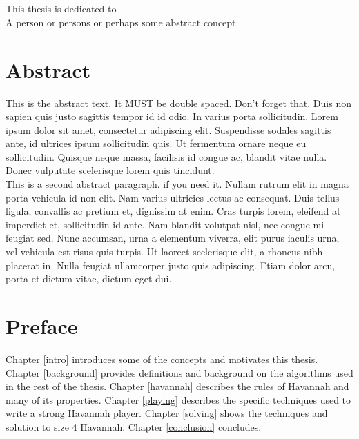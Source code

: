 \documentclass[12pt, letterpaper]{report}
\renewcommand{\baselinestretch}{1.33}
\numberwithin{equation}{section}
\begin{document}
  
   \newpage 
  \chapter*{}
  \thispagestyle{empty}
  This thesis is dedicated to\\
  A person or persons or perhaps some abstract concept.

  \newpage 
  \chapter*{Abstract}
  \thispagestyle{empty}
  \vspace*{-0.7in}
  \renewcommand{\baselinestretch}{1.8}
  \normalsize{
  This is the abstract text. It MUST be double spaced. Don't forget that. Duis non sapien quis justo sagittis tempor id id odio. In varius porta sollicitudin. Lorem ipsum dolor sit amet, consectetur adipiscing elit. Suspendisse sodales sagittis ante, id ultrices ipsum sollicitudin quis. Ut fermentum ornare neque eu sollicitudin. Quisque neque massa, facilisis id congue ac, blandit vitae nulla. Donec vulputate scelerisque lorem quis tincidunt.
  } \vspace*{-0.2in} \\
  
  \normalsize{
  This is a second abstract paragraph. if you need it. Nullam rutrum elit in magna porta vehicula id non elit. Nam varius ultricies lectus ac consequat. Duis tellus ligula, convallis ac pretium et, dignissim at enim. Cras turpis lorem, eleifend at imperdiet et, sollicitudin id ante. Nam blandit volutpat nisl, nec congue mi feugiat sed. Nunc accumsan, urna a elementum viverra, elit purus iaculis urna, vel vehicula est risus quis turpis. Ut laoreet scelerisque elit, a rhoncus nibh placerat in. Nulla feugiat ullamcorper justo quis adipiscing. Etiam dolor arcu, porta et dictum vitae, dictum eget dui.
  }
  \renewcommand{\baselinestretch}{1.33}
  
  \newpage 
  \chapter*{Preface}
  \thispagestyle{empty}
  \vspace*{-0.7in}

Chapter \ref{intro} introduces some of the concepts and motivates this thesis. Chapter \ref{background} provides definitions and background on the algorithms used in the rest of the thesis. Chapter \ref{havannah} describes the rules of Havannah and many of its properties. Chapter \ref{playing} describes the specific techniques used to write a strong Havannah player. Chapter \ref{solving} shows the techniques and solution to size 4 Havannah. Chapter \ref{conclusion} concludes.
\end{document}
